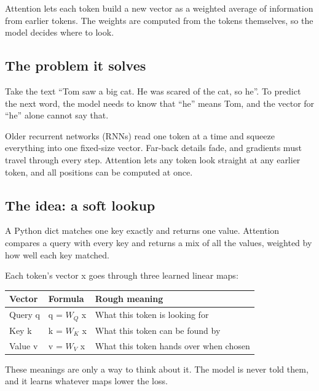 \documentclass[11pt,a4paper]{article}
\begin{document}
Attention lets each token build a new vector as a weighted average of information from earlier tokens. The weights are computed from the tokens themselves, so the model decides where to look.

\subsection*{The problem it solves}
{}

Take the text “Tom saw a big cat. He was scared of the cat, so he”. To predict the next word, the model needs to know that “he” means Tom, and the vector for “he” alone cannot say that.

Older recurrent networks (RNNs) read one token at a time and squeeze everything into one fixed-size vector. Far-back details fade, and gradients must travel through every step. Attention lets any token look straight at any earlier token, and all positions can be computed at once.

\subsection*{The idea: a soft lookup}
{}

A Python dict matches one key exactly and returns one value. Attention compares a query with every key and returns a mix of all the values, weighted by how well each key matched.

Each token's vector x goes through three learned linear maps:

{\small
\begin{longtable}{@{}>{\raggedright\arraybackslash}p{}>{\raggedright\arraybackslash}p{}>{\raggedright\arraybackslash}p{}@{}}
\toprule
\textbf{Vector} & \textbf{Formula} & \textbf{Rough meaning} \\
\midrule
\endhead
Query q & q = $W_Q$ x & What this token is looking for \\
Key k & k = $W_K$ x & What this token can be found by \\
Value v & v = $W_V$ x & What this token hands over when chosen \\
\bottomrule
\end{longtable}
}

These meanings are only a way to think about it. The model is never told them, and it learns whatever maps lower the loss.
\end{document}
